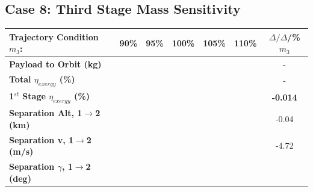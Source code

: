 \subsection{Case 8: Third Stage Mass Sensitivity}\label{sec:m3noReturn}

\begin{table}[ht] %
	\centering
	
	\begin{tabular}{l c c c c c c} 
		\hline \textbf{Trajectory Condition}   \qquad  $m_{3}$:
		&90\%
		&95\%
		&100\%
		&105\%
		&110\%
		& $\Delta/\Delta$/\%$m_{3}$
		\\
		\hline \textbf{Payload to Orbit (kg)}
		& \textbf{\PayloadToOrbitmThreeNinetyNoReturn}
		& \textbf{\PayloadToOrbitmThreeNinetyFiveNoReturn}
		& \textbf{\PayloadToOrbitmThreeStandardNoReturn}
		& \textbf{\PayloadToOrbitmThreeOneHundredFiveNoReturn}
		& \textbf{\PayloadToOrbitmThreeOneHundredTenNoReturn}
		& -
		\\
		\textbf{Total $\eta_{exergy}$ (\%)}
		& \textbf{\totalExergyEffmThreeNinetyNoReturn}
		& \textbf{\totalExergyEffmThreeNinetyFiveNoReturn}
		& \textbf{\totalExergyEffmThreeStandardNoReturn}
		& \textbf{\totalExergyEffmThreeOneHundredFiveNoReturn}
		& \textbf{\totalExergyEffmThreeOneHundredTenNoReturn}
		& -
		\\
		\hline 
		\textbf{1$^{st}$ Stage $\eta_{exergy}$ (\%)}
		& \textbf{\firstExergyEffmThreeNinetyNoReturn}
		& \textbf{\firstExergyEffmThreeNinetyFiveNoReturn}
		& \textbf{\firstExergyEffmThreeStandardNoReturn}
		& \textbf{\firstExergyEffmThreeOneHundredFiveNoReturn}
		& \textbf{\firstExergyEffmThreeOneHundredTenNoReturn}
		& \textbf{-0.014}
		\\
		\textbf{Separation Alt, 1$\rightarrow$2 (km)}
		& \firstsecondSeparationAltmThreeNinetyNoReturn
		& \firstsecondSeparationAltmThreeNinetyFiveNoReturn
		& \firstsecondSeparationAltmThreeStandardNoReturn
		& \firstsecondSeparationAltmThreeOneHundredFiveNoReturn
		& \firstsecondSeparationAltmThreeOneHundredTenNoReturn
		&-0.04
		\\
		\textbf{Separation v, 1$\rightarrow$2 (m/s)}
		& \firstsecondSeparationvmThreeNinetyNoReturn
		& \firstsecondSeparationvmThreeNinetyFiveNoReturn
		& \firstsecondSeparationvmThreeStandardNoReturn
		& \firstsecondSeparationvmThreeOneHundredFiveNoReturn
		& \firstsecondSeparationvmThreeOneHundredTenNoReturn
		&-4.72
		\\
		\textbf{Separation $\gamma$, 1$\rightarrow$2 (deg)}
		& \firstsecondSeparationgammamThreeNinetyNoReturn
		& \firstsecondSeparationgammamThreeNinetyFiveNoReturn

\end{tabular}
\end{table}

